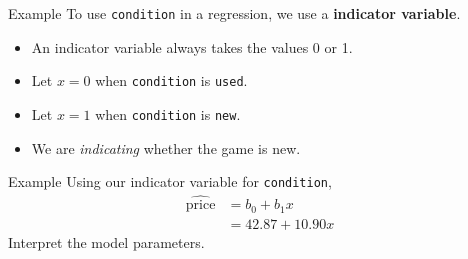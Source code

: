 \begin{frame}{Example}
    To use \texttt{condition} in a regression, we use a \textbf{indicator variable}.
    \begin{itemize}
        \item An indicator variable always takes the values 0 or 1.
        \item Let $x=0$ when \texttt{condition} is \texttt{used}. 
        \item Let $x=1$ when \texttt{condition} is \texttt{new}. 
        \item We are \textit{indicating} whether the game is new. 
    \end{itemize}
\end{frame}

\begin{frame}{Example}
    Using our indicator variable for \texttt{condition},
    \begin{align*}
        \hat{\text{price}} &= b_0 + b_1 x \\
                        &= 42.87 + 10.90 x
    \end{align*}
    Interpret the model parameters. 
\end{frame}
